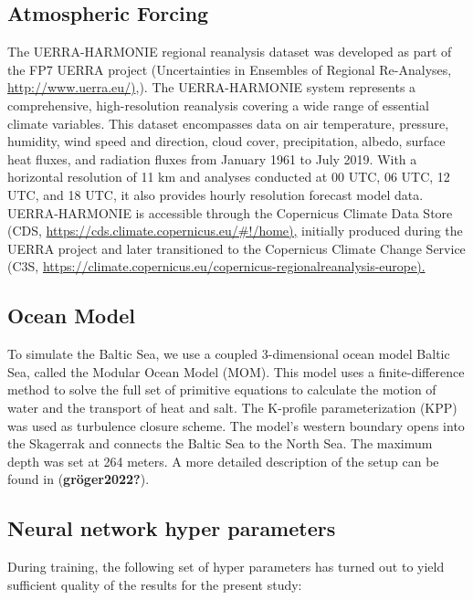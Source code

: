 \documentclass[
]{agujournal2019}
\begin{document}
\subsection{Atmospheric Forcing}\label{atmospheric-forcing}

The UERRA-HARMONIE regional reanalysis dataset was developed as part of
the FP7 UERRA project (Uncertainties in Ensembles of Regional
Re-Analyses, \href{http://www.uerra.eu/}{http://www.uerra.eu/)},). The
UERRA-HARMONIE system represents a comprehensive, high-resolution
reanalysis covering a wide range of essential climate variables. This
dataset encompasses data on air temperature, pressure, humidity, wind
speed and direction, cloud cover, precipitation, albedo, surface heat
fluxes, and radiation fluxes from January 1961 to July 2019. With a
horizontal resolution of 11 km and analyses conducted at 00 UTC, 06 UTC,
12 UTC, and 18 UTC, it also provides hourly resolution forecast model
data. UERRA-HARMONIE is accessible through the Copernicus Climate Data
Store (CDS, \url{https://cds.climate.copernicus.eu/\#!/home),} initially
produced during the UERRA project and later transitioned to the
Copernicus Climate Change Service (C3S,
\url{https://climate.copernicus.eu/copernicus-regionalreanalysis-europe).}

\subsection{Ocean Model}\label{ocean-model}

To simulate the Baltic Sea, we use a coupled 3-dimensional ocean model
Baltic Sea, called the Modular Ocean Model (MOM). This model uses a
finite-difference method to solve the full set of primitive equations to
calculate the motion of water and the transport of heat and salt. The
K-profile parameterization (KPP) was used as turbulence closure scheme.
The model's western boundary opens into the Skagerrak and connects the
Baltic Sea to the North Sea. The maximum depth was set at 264 meters. A
more detailed description of the setup can be found in
(\textbf{gröger2022?}).

\subsection{Neural network hyper
parameters}\label{neural-network-hyper-parameters}

During training, the following set of hyper parameters has turned out to
yield sufficient quality of the results for the present study:
\end{document}
